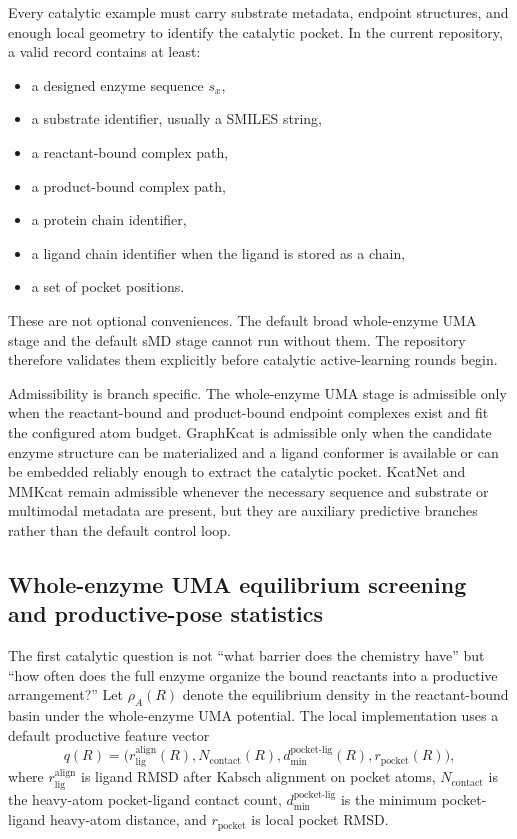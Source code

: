 \documentclass[11pt]{article}
\begin{document}
	Every catalytic example must carry substrate metadata, endpoint structures, and enough local geometry to identify the catalytic pocket. In the current repository, a valid record contains at least:
	\begin{itemize}[leftmargin=1.5em]
		\item a designed enzyme sequence $s_x$,
		\item a substrate identifier, usually a SMILES string,
		\item a reactant-bound complex path,
		\item a product-bound complex path,
		\item a protein chain identifier,
		\item a ligand chain identifier when the ligand is stored as a chain,
		\item a set of pocket positions.
	\end{itemize}
	These are not optional conveniences. The default broad whole-enzyme UMA stage and the default sMD stage cannot run without them. The repository therefore validates them explicitly before catalytic active-learning rounds begin.
	
	Admissibility is branch specific. The whole-enzyme UMA stage is admissible only when the reactant-bound and product-bound endpoint complexes exist and fit the configured atom budget. GraphKcat is admissible only when the candidate enzyme structure can be materialized and a ligand conformer is available or can be embedded reliably enough to extract the catalytic pocket. KcatNet and MMKcat remain admissible whenever the necessary sequence and substrate or multimodal metadata are present, but they are auxiliary predictive branches rather than the default control loop.
	
	\subsection{Whole-enzyme UMA equilibrium screening and productive-pose statistics}
	
	The first catalytic question is not ``what barrier does the chemistry have'' but ``how often does the full enzyme organize the bound reactants into a productive arrangement?'' Let $\rho_A(R)$ denote the equilibrium density in the reactant-bound basin under the whole-enzyme UMA potential. The local implementation uses a default productive feature vector
	\begin{equation}
		q(R)=
		\Big(
		r_{\mathrm{lig}}^{\mathrm{align}}(R),
		N_{\mathrm{contact}}(R),
		d_{\min}^{\mathrm{pocket\text{-}lig}}(R),
		r_{\mathrm{pocket}}(R)
		\Big),
	\end{equation}
	where $r_{\mathrm{lig}}^{\mathrm{align}}$ is ligand RMSD after Kabsch alignment on pocket atoms, $N_{\mathrm{contact}}$ is the heavy-atom pocket-ligand contact count, $d_{\min}^{\mathrm{pocket\text{-}lig}}$ is the minimum pocket-ligand heavy-atom distance, and $r_{\mathrm{pocket}}$ is local pocket RMSD.
	
\end{document}
